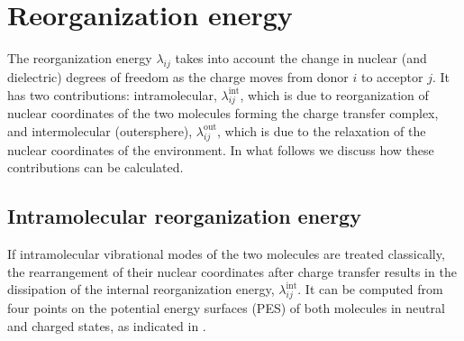 \section{Reorganization energy}
\label{sec:reorganization}

The reorganization energy $\lambda_{ij}$ takes into account the change in  nuclear (and dielectric) degrees of freedom as the charge moves from donor $i$ to acceptor $j$. It has two contributions: intramolecular, $\lambda^\text{int}_{ij}$, which is due to reorganization of nuclear coordinates of the two molecules forming the charge transfer complex, and intermolecular (outersphere), $\lambda^\text{out}_{ij}$, which is due to the relaxation of the nuclear coordinates of the environment. In what follows we discuss how these contributions can be calculated.

\subsection{Intramolecular reorganization energy}
\label{sec:eintramolecular}
If intramolecular vibrational modes of the two molecules are treated classically, the rearrangement of their nuclear coordinates after charge transfer results in the dissipation of the internal reorganization energy, $\lambda_{ij}^\text{int}$. It can be computed from four points on the potential energy surfaces (PES) of both molecules in neutral and charged states, as indicated in . 

